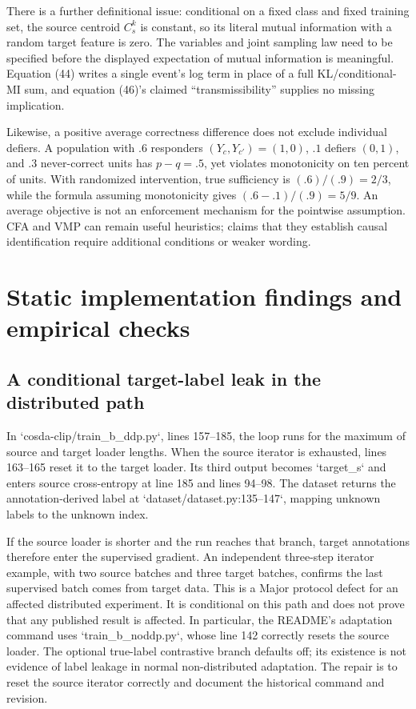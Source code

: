 \documentclass[10pt]{article}
\begin{document}
There is a further definitional issue: conditional on a fixed class and fixed training set, the source centroid \(C_s^k\) is constant, so its literal mutual information with a random target feature is zero. The variables and joint sampling law need to be specified before the displayed expectation of mutual information is meaningful. Equation (44) writes a single event’s log term in place of a full KL/conditional-MI sum, and equation (46)’s claimed “transmissibility” supplies no missing implication.\par
Likewise, a positive average correctness difference does not exclude individual defiers. A population with \(.6\) responders \((Y_c,Y_{c'})=(1,0)\), \(.1\) defiers \((0,1)\), and \(.3\) never-correct units has \(p-q=.5\), yet violates monotonicity on ten percent of units. With randomized intervention, true sufficiency is \((.6)/(.9)=2/3\), while the formula assuming monotonicity gives \((.6-.1)/(.9)=5/9\). An average objective is not an enforcement mechanism for the pointwise assumption. CFA and VMP can remain useful heuristics; claims that they establish causal identification require additional conditions or weaker wording.\par
\section*{Static implementation findings and empirical checks}
\subsection*{A conditional target-label leak in the distributed path}
In `cosda-clip/train\_b\_ddp.py`, lines 157–185, the loop runs for the maximum of source and target loader lengths. When the source iterator is exhausted, lines 163–165 reset it to the target loader. Its third output becomes `target\_s` and enters source cross-entropy at line 185 and lines 94–98. The dataset returns the annotation-derived label at `dataset/dataset.py:135--147`, mapping unknown labels to the unknown index.\par
If the source loader is shorter and the run reaches that branch, target annotations therefore enter the supervised gradient. An independent three-step iterator example, with two source batches and three target batches, confirms the last supervised batch comes from target data. This is a Major protocol defect for an affected distributed experiment. It is conditional on this path and does not prove that any published result is affected. In particular, the README’s adaptation command uses `train\_b\_noddp.py`, whose line 142 correctly resets the source loader. The optional true-label contrastive branch defaults off; its existence is not evidence of label leakage in normal non-distributed adaptation. The repair is to reset the source iterator correctly and document the historical command and revision.\par
\end{document}
